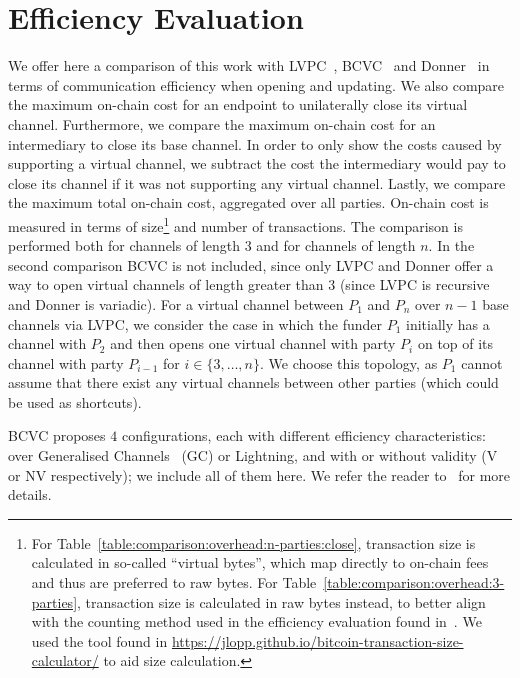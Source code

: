 \section{Efficiency Evaluation}
  \label{section:comparison}
  We offer here a comparison of this work with
  LVPC~\cite{10.1007/978-3-030-65411-5_18}, BCVC~\cite{cryptoeprint:2020:554}
  and Donner~\cite{donner} in terms of communication efficiency when opening and
  updating. We also compare
  the maximum on-chain cost for an endpoint to unilaterally close its virtual
  channel. Furthermore, we compare the maximum on-chain cost for an intermediary
  to close its base channel. In order to only show the costs caused by
  supporting a virtual channel, we subtract the cost the intermediary would pay
  to close its channel if it was not supporting any virtual channel. Lastly, we
  compare the maximum total on-chain cost, aggregated over all parties. On-chain
  cost is measured in terms of size\footnote{For
  Table~\ref{table:comparison:overhead:n-parties:close}, transaction size is
  calculated in
  so-called ``virtual bytes'', which map directly to on-chain fees and thus are
  preferred to raw bytes. For Table~\ref{table:comparison:overhead:3-parties},
  transaction size is calculated in raw bytes instead, to better align with the
  counting method used in the efficiency evaluation found
  in~\cite{cryptoeprint:2020:554}. We used the tool found in
  \url{https://jlopp.github.io/bitcoin-transaction-size-calculator/} to aid size
  calculation.} and number of transactions. The comparison is performed both for
  channels of length $3$ and for channels of length $n$. In the second
  comparison BCVC is not included, since only LVPC and Donner offer a way to
  open virtual channels of length greater than $3$ (since LVPC is recursive and
  Donner is variadic). For a virtual channel between $P_1$ and $P_n$ over $n-1$
  base channels via LVPC, we consider the case in which the funder $P_1$
  initially has a channel with $P_2$ and then opens one virtual channel with
  party $P_i$ on top of its channel with party $P_{i-1}$ for $i \in \{3, \dots,
  n\}$. We choose this topology, as $P_1$ cannot assume that there exist any
  virtual channels between other parties (which could be used as shortcuts).

  BCVC proposes $4$ configurations, each with different efficiency
  characteristics: over Generalised Channels~\cite{cryptoeprint:2020:476} (GC)
  or Lightning, and with or without validity (V or NV respectively); we include
  all of them here. We refer the reader to~\cite{cryptoeprint:2020:554} for more
  details.

